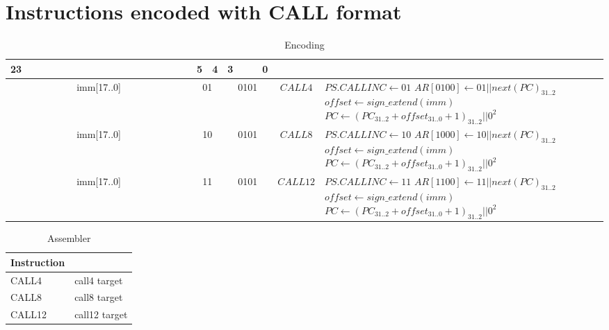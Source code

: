 \section*{Instructions encoded with CALL format}
\begin{longtable}{llllllllllllllllllllllll  p{1cm}  p{7cm} | }
	\caption{Encoding\label{long}}\\
	23 & & & & & & & & & & & & & & & & & & 5 & 4 & 3 & & & 0 & &
	\multicolumn{1}{c}{}\\
	\hline
	\multicolumn{18}{|c|}{imm[17..0]} & \multicolumn{2}{c|}{01} & \multicolumn{4}{c|}{0101} & \multicolumn{1}{c|}{$CALL4$} & $PS.CALLINC \leftarrow {01}$ \newline $AR[0100] \leftarrow 01||next(PC)_{31..2}$ \newline $offset \leftarrow sign\_extend(imm)$ \newline $PC \leftarrow (PC_{31..2}+offset_{31..0}+1)_{31..2}||0^2$\\ \hline
	\multicolumn{18}{|c|}{imm[17..0]} & \multicolumn{2}{c|}{10} & \multicolumn{4}{c|}{0101} & \multicolumn{1}{c|}{$CALL8$} &$PS.CALLINC \leftarrow {10}$ \newline $AR[1000] \leftarrow 10||next(PC)_{31..2}$ \newline $offset \leftarrow sign\_extend(imm)$ \newline $PC \leftarrow (PC_{31..2}+offset_{31..0}+1)_{31..2}||0^2$\\ \hline
	\multicolumn{18}{|c|}{imm[17..0]} & \multicolumn{2}{c|}{11} & \multicolumn{4}{c|}{0101} & \multicolumn{1}{c|}{$CALL12$} & $PS.CALLINC \leftarrow {11}$ \newline $AR[1100] \leftarrow 11||next(PC)_{31..2}$ \newline $offset \leftarrow sign\_extend(imm)$ \newline $PC \leftarrow (PC_{31..2}+offset_{31..0}+1)_{31..2}||0^2$\\ \hline
\end{longtable}

\begin{longtable}{|p{5cm}|p{5cm}|}
	\caption{Assembler\label{long}}\\
	\hline
	Instruction & \\
	\hline
	CALL4 & call4 target\\ \hline
	CALL8 & call8 target\\ \hline
	CALL12 & call12 target\\ \hline
\end{longtable}

